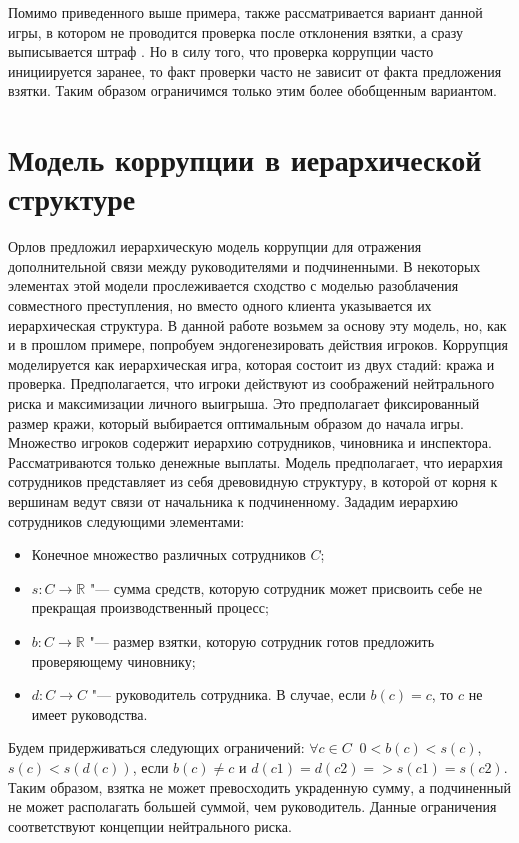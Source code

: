 \par
Помимо приведенного выше примера, также рассматривается вариант данной игры, в котором не проводится проверка после отклонения взятки, а сразу выписывается штраф \cite{Spengler}. Но в силу того, что проверка коррупции часто инициируется заранее, то факт проверки часто не зависит от факта предложения взятки. Таким образом ограничимся только этим более обобщенным вариантом.
\section{Модель коррупции в иерархической структуре}
Орлов\cite{Orlov} предложил иерархическую модель коррупции для отражения дополнительной связи между руководителями и подчиненными. В некоторых элементах этой модели прослеживается сходство с моделью разоблачения совместного преступления, но вместо одного клиента указывается их иерархическая структура. В данной работе возьмем за основу эту модель, но, как и в прошлом примере, попробуем эндогенезировать действия игроков.
Коррупция моделируется как иерархическая игра, которая состоит из двух стадий: кража и проверка. Предполагается, что игроки действуют из соображений нейтрального риска и максимизации личного выигрыша. Это предполагает фиксированный размер кражи, который выбирается оптимальным образом до начала игры. Множество игроков содержит иерархию сотрудников, чиновника и инспектора.  Рассматриваются только денежные выплаты. Модель предполагает, что иерархия сотрудников представляет из себя древовидную структуру, в которой от корня к вершинам ведут связи от начальника к подчиненному.
Зададим иерархию сотрудников следующими элементами:
\begin{itemize}
\item Конечное множество различных сотрудников $C$;
\item $s\colon C\to \mathbb{R}$ "--- сумма средств, которую сотрудник может присвоить себе не прекращая производственный процесс;
\item $b\colon C\to \mathbb{R}$ "--- размер взятки, которую сотрудник готов предложить проверяющему чиновнику;
\item $d\colon C\to C$ "--- руководитель сотрудника. В случае, если  $b(c) = c$, то $c$ не имеет руководства.
 
\end{itemize}
Будем придерживаться следующих ограничений: $\forall c \in C\;\;0 < b(c) < s(c)$, $s(c) < s(d(c))$, если $b(c) \neq c$ и $d(c1)=d(c2) =>s(c1)=s(c2)$. Таким образом, взятка не может превосходить украденную сумму, а подчиненный не может располагать большей суммой, чем руководитель. Данные ограничения соответствуют концепции нейтрального риска\cite{Orlov}.
